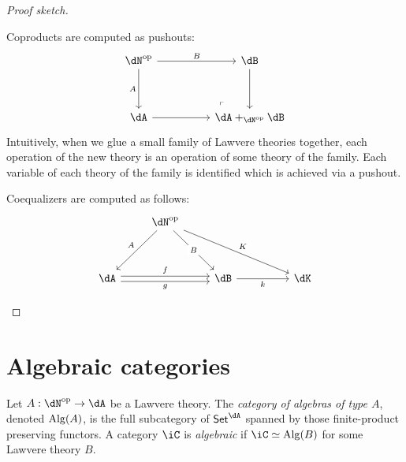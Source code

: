 \documentclass{zett}
\begin{document}
\begin{proof}[Proof sketch]
  \begin{node}
    Coproducts are computed as pushouts:
    \[
      \begin{tikzcd}
	\dN\op && \dB \\
	\\
	\dA && {\dA +_{\dN\op} \dB}
	\arrow["A"', from=1-1, to=3-1]
	\arrow["B", from=1-1, to=1-3]
	\arrow[from=3-1, to=3-3]
	\arrow[from=1-3, to=3-3]
	\arrow["\lrcorner"{anchor=center, pos=0.125, rotate=180}, draw=none, from=3-3, to=1-1]
      \end{tikzcd}
    \]
    Intuitively, when we glue a small family of Lawvere theories together, each operation of the new theory is an operation of some theory of the family.
    Each variable of each theory of the family is identified which is achieved via a pushout.
  \end{node}
  \begin{node}
    Coequalizers are computed as follows:
    \[
      \begin{tikzcd}
	& \dN\op \\
	\\
	\dA && \dB && \dK
	\arrow["f", shift left, from=3-1, to=3-3]
	\arrow["g"', shift right, from=3-1, to=3-3]
	\arrow["k"', from=3-3, to=3-5]
	\arrow["B"{description}, from=1-2, to=3-3]
	\arrow["K", from=1-2, to=3-5]
	\arrow["A"', from=1-2, to=3-1]
      \end{tikzcd}
    \]
  \end{node}
\end{proof}

\section{Algebraic categories}
\label{sec:algebraic-categories}

\begin{defn}
  Let $A : \dN\op \to \dA$ be a Lawvere theory.
  The \emph{category of algebras of type $A$}, denoted $\operatorname{Alg}(A)$, is the full subcategory of $\CSet^{\dA}$ spanned by those finite-product preserving functors.
  A category $\iC$ is \emph{algebraic} if $\iC \eqv \Alg(B)$ for some Lawvere theory $B$.
\end{defn}
\end{document}

